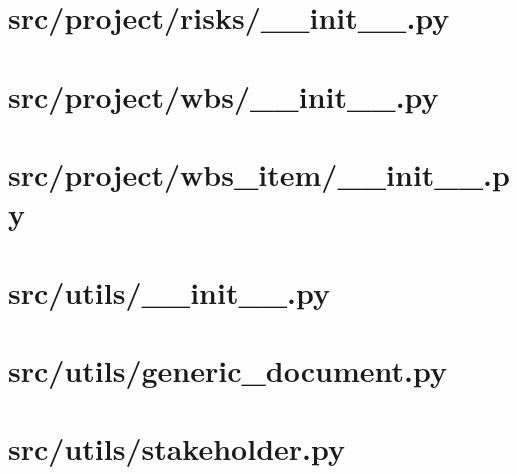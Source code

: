 \section{src/project/risks/\_\_init\_\_.py}


\pagebreak

\section{src/project/wbs/\_\_init\_\_.py}


\pagebreak

\section{src/project/wbs\_item/\_\_init\_\_.py}


\pagebreak

\section{src/utils/\_\_init\_\_.py}


\pagebreak

\section{src/utils/generic\_document.py}


\pagebreak

\section{src/utils/stakeholder.py}
